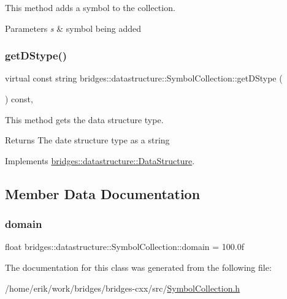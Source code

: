 This method adds a symbol to the collection. 


\begin{DoxyParams}{Parameters}
{\em s} & symbol being added \\
\hline
\end{DoxyParams}
\mbox{\label{classbridges_1_1datastructure_1_1_symbol_collection_a8f63c31a48a12127978967b706fc38f5}} 
\subsubsection{\texorpdfstring{get\+D\+Stype()}{getDStype()}}
{\footnotesize\ttfamily virtual const string bridges\+::datastructure\+::\+Symbol\+Collection\+::get\+D\+Stype (\begin{DoxyParamCaption}{ }\end{DoxyParamCaption}) const\hspace{0.3cm}{\ttfamily [inline]}, {\ttfamily [virtual]}}



This method gets the data structure type. 

\begin{DoxyReturn}{Returns}
The date structure type as a string 
\end{DoxyReturn}


Implements \hyperlink{classbridges_1_1datastructure_1_1_data_structure_a4ff66cb34409f11fe9fc647f6d8a22ce}{bridges\+::datastructure\+::\+Data\+Structure}.



\subsection{Member Data Documentation}
\mbox{\label{classbridges_1_1datastructure_1_1_symbol_collection_a5e14cae08319875f60d6bdf7f8c880ab}} 
\subsubsection{\texorpdfstring{domain}{domain}}
{\footnotesize\ttfamily float bridges\+::datastructure\+::\+Symbol\+Collection\+::domain = 100.\+0f\hspace{0.3cm}{\ttfamily [protected]}}



The documentation for this class was generated from the following file\+:\begin{DoxyCompactItemize}
\item 
/home/erik/work/bridges/bridges-\/cxx/src/\hyperlink{_symbol_collection_8h}{Symbol\+Collection.\+h}\end{DoxyCompactItemize}
